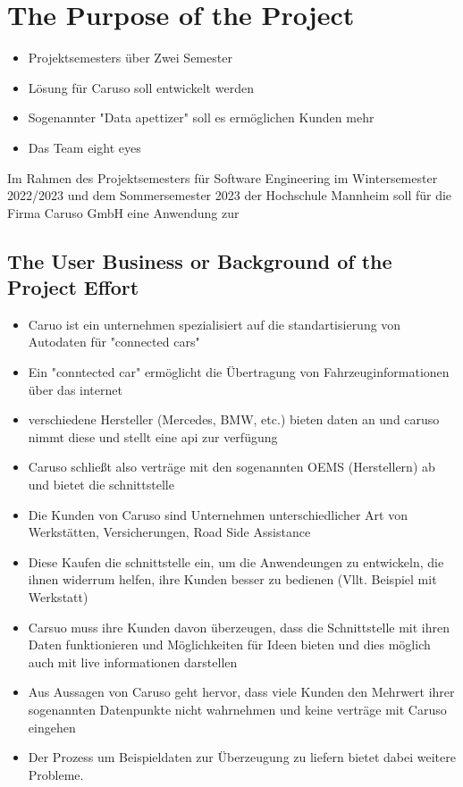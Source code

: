 \chapter{The Purpose of the Project}
\begin{itemize}
  \item Projektsemesters über Zwei Semester
  \item Lösung für Caruso soll entwickelt werden
  \item Sogenannter "Data apettizer" soll es ermöglichen Kunden mehr
  \item Das Team eight eyes
\end{itemize}
Im Rahmen des Projektsemesters für Software Engineering im Wintersemester 2022/2023 und dem Sommersemester 2023 der Hochschule Mannheim soll für die Firma Caruso GmbH eine Anwendung zur

\section{The User Business or Background of the Project Effort}
\begin{itemize}
  \item Caruo ist ein unternehmen spezialisiert auf die standartisierung von Autodaten für "connected cars"
  \item Ein "conntected car" ermöglicht die Übertragung von Fahrzeuginformationen über das internet
  \item verschiedene Hersteller (Mercedes, BMW, etc.) bieten daten an und caruso nimmt diese und stellt eine api zur verfügung
  \item Caruso schließt also verträge mit den sogenannten OEMS (Herstellern) ab und bietet die schnittstelle
  \item Die Kunden von Caruso sind Unternehmen unterschiedlicher Art von Werkstätten, Versicherungen, Road Side Assistance
  \item Diese Kaufen die schnittstelle ein, um die Anwendeungen zu entwickeln, die ihnen widerrum helfen, ihre Kunden besser zu bedienen (Vllt. Beispiel mit Werkstatt)
  \item Carsuo muss ihre Kunden davon überzeugen, dass die Schnittstelle mit ihren Daten funktionieren und Möglichkeiten für Ideen bieten und dies möglich auch mit live informationen darstellen
  \item Aus Aussagen von Caruso geht hervor, dass viele Kunden den Mehrwert ihrer sogenannten Datenpunkte nicht wahrnehmen und keine verträge mit Caruso eingehen
  \item Der Prozess um Beispieldaten zur Überzeugung zu liefern bietet dabei weitere Probleme.
\end{itemize}
